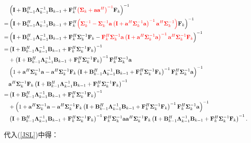 \documentclass[a4paper,11pt]{article}
\newcommand\V[1]{\mathrm{\bf{#1}}}
\newcommand\SB[1]{\left(#1\right)}
\begin{document}
\begin{equation}
\begin{split}
&\SB{\V{I}+\V{B}_{k-1}^H\bm{\Lambda}_{k-1}^{-1}\V{B}_{k-1}+\V{F}_{k}^H\textcolor{red}{\SB{\bm{\Sigma}_{k}+\V{a}\V{a}^H}^{-1}}\V{F}_{k}}^{-1}\\
=&\SB{\V{I}+\V{B}_{k-1}^H\bm{\Lambda}_{k-1}^{-1}\V{B}_{k-1}+\V{F}_{k}^H\textcolor{red}{\SB{\bm{\Sigma}_{k}^{-1} - \bm{\Sigma}_{k}^{-1} \V{a}\SB{\V{I}+\V{a}^H \bm{\Sigma}_{k}^{-1}  \V{a}}^{-1} \V{a}^H\bm{\Sigma}_{k}^{-1} }}\V{F}_{k}}^{-1}\\
=&\SB{\V{I}+\V{B}_{k-1}^H\bm{\Lambda}_{k-1}^{-1}\V{B}_{k-1}+\V{F}_{k}^H \bm{\Sigma}_{k}^{-1}\V{F}_{k} -\textcolor{red}{\V{F}_{k}^H\bm{\Sigma}_{k}^{-1} \V{a}\SB{\V{I}+\V{a}^H \bm{\Sigma}_{k}^{-1}  \V{a}}^{-1} \V{a}^H\bm{\Sigma}_{k}^{-1} \V{F}_{k}}}^{-1}\\
=&\SB{\V{I}+\V{B}_{k-1}^H\bm{\Lambda}_{k-1}^{-1}\V{B}_{k-1}+\V{F}_{k}^H \bm{\Sigma}_{k}^{-1}\V{F}_{k}}^{-1}\\
&+\SB{\V{I}+\V{B}_{k-1}^H\bm{\Lambda}_{k-1}^{-1}\V{B}_{k-1}+\V{F}_{k}^H \bm{\Sigma}_{k}^{-1}\V{F}_{k}}^{-1}\V{F}_{k}^H\bm{\Sigma}_{k}^{-1} \V{a}\\
&\SB{1+\V{a}^H \bm{\Sigma}_{k}^{-1}\V{a}-\V{a}^H\bm{\Sigma}_{k}^{-1} \V{F}_{k}\SB{\V{I}+\V{B}_{k-1}^H\bm{\Lambda}_{k-1}^{-1}\V{B}_{k-1}+\V{F}_{k}^H \bm{\Sigma}_{k}^{-1}\V{F}_{k}}^{-1} \V{F}_{k}^H\bm{\Sigma}_{k}^{-1} \V{a} }^{-1} \\
&\V{a}^H\bm{\Sigma}_{k}^{-1} \V{F}_{k}\SB{\V{I}+\V{B}_{k-1}^H\bm{\Lambda}_{k-1}^{-1}\V{B}_{k-1}+\V{F}_{k}^H \bm{\Sigma}_{k}^{-1}\V{F}_{k}}^{-1}\\
=&\SB{\V{I}+\V{B}_{k-1}^H\bm{\Lambda}_{k-1}^{-1}\V{B}_{k-1}+\V{F}_{k}^H \bm{\Sigma}_{k}^{-1}\V{F}_{k}}^{-1}\\
&+\SB{1+\V{a}^H \bm{\Sigma}_{k}^{-1}\V{a}-\V{a}^H\bm{\Sigma}_{k}^{-1} \V{F}_{k}\SB{\V{I}+\V{B}_{k-1}^H\bm{\Lambda}_{k-1}^{-1}\V{B}_{k-1}+\V{F}_{k}^H \bm{\Sigma}_{k}^{-1}\V{F}_{k}}^{-1} \V{F}_{k}^H\bm{\Sigma}_{k}^{-1} \V{a} }^{-1} \\
&\SB{\V{I}+\V{B}_{k-1}^H\bm{\Lambda}_{k-1}^{-1}\V{B}_{k-1}+\V{F}_{k}^H \bm{\Sigma}_{k}^{-1}\V{F}_{k}}^{-1}\V{F}_{k}^H\bm{\Sigma}_{k}^{-1} \V{a}\V{a}^H\bm{\Sigma}_{k}^{-1} \V{F}_{k}\SB{\V{I}+\V{B}_{k-1}^H\bm{\Lambda}_{k-1}^{-1}\V{B}_{k-1}+\V{F}_{k}^H \bm{\Sigma}_{k}^{-1}\V{F}_{k}}^{-1}.\\
\end{split}
\end{equation}

代入(\ref{JSL})中得：
\end{document}
